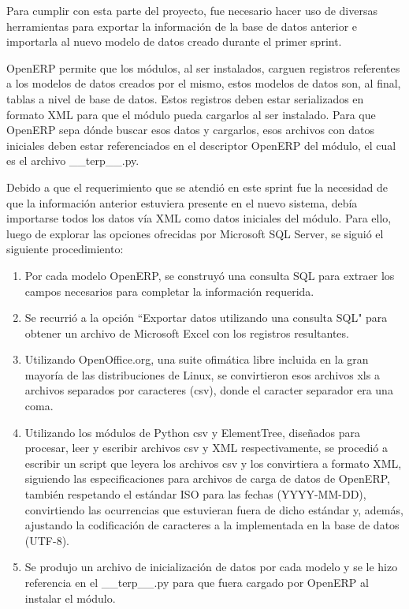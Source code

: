 \documentclass[a4paper, 12pt]{article}
\begin{document}
Para cumplir con esta parte del proyecto, fue necesario hacer uso de diversas herramientas para exportar la información de la base de datos anterior e importarla al nuevo modelo de datos creado durante el primer sprint.

OpenERP permite que los módulos, al ser instalados, carguen registros referentes a los modelos de datos creados por el mismo, estos modelos de datos son, al final, tablas a nivel de base de datos. Estos registros deben estar serializados en formato XML para que el módulo pueda cargarlos al ser instalado. Para que OpenERP sepa dónde buscar esos datos y cargarlos, esos archivos con datos iniciales deben estar referenciados en el descriptor OpenERP del módulo, el cual es el archivo \_\_terp\_\_.py.

Debido a que el requerimiento que se atendió en este sprint fue la necesidad de que la información anterior estuviera presente en el nuevo sistema, debía importarse todos los datos vía XML como datos iniciales del módulo. Para ello, luego de explorar las opciones ofrecidas por Microsoft SQL Server, se siguió el siguiente procedimiento:
\begin{enumerate}
    \item Por cada modelo OpenERP, se construyó una consulta SQL para extraer los campos necesarios para completar la información requerida.
    \item Se recurrió a la opción ``Exportar datos utilizando una consulta SQL" para obtener un archivo de Microsoft Excel con los registros resultantes.
    \item Utilizando OpenOffice.org, una suite ofimática libre incluida en la gran mayoría de las distribuciones de Linux, se convirtieron esos archivos xls a archivos separados por caracteres (csv), donde el caracter separador era una coma.
    \item Utilizando los módulos de Python csv y ElementTree, diseñados para procesar, leer y escribir archivos csv y XML respectivamente, se procedió a escribir un script que leyera los archivos csv y los convirtiera a formato XML, siguiendo las especificaciones para archivos de carga de datos de OpenERP, también respetando el estándar ISO para las fechas (YYYY-MM-DD), convirtiendo las ocurrencias que estuvieran fuera de dicho estándar y, además, ajustando la codificación de caracteres a la implementada en la base de datos (UTF-8).
    \item Se produjo un archivo de inicialización de datos por cada modelo y se le hizo referencia en el \_\_terp\_\_.py para que fuera cargado por OpenERP al instalar el módulo.
\end{enumerate}
\end{document}
